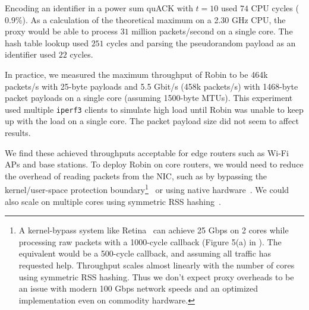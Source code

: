Encoding an identifier in a power sum quACK with $t=10$ used $74$ CPU
cycles ($0.9\%$). As a calculation of the theoretical maximum on a 2.30 GHz
CPU, the proxy would be able to process $31$ million packets/second on a single
core. The hash table lookup used $251$ cycles and parsing the pseudorandom
payload as an identifier used $22$ cycles.

In practice, we measured the maximum throughput of Robin to
be 464k packets/s with 25-byte payloads and 5.5 Gbit/s (458k packets/s) with
1468-byte packet payloads on a single core (assuming 1500-byte MTUs).
This experiment used multiple \texttt{iperf3} clients to simulate high
load until Robin was unable to keep up with the load on a single core.
The packet payload size did not seem to affect results.

We find these achieved throughputs acceptable for edge routers such as Wi-Fi
APs and base stations.
To deploy Robin on core routers, we would need to reduce the overhead of reading
packets from the NIC, such as by bypassing the kernel/user-space
protection boundary\footnote{
A kernel-bypass system like Retina~\cite{wan2022retina} can achieve
25 Gbps on 2 cores while processing raw packets with a 1000-cycle callback
(Figure 5(a) in \cite{wan2022retina}). The \Sys equivalent would be a 500-cycle
callback, and assuming all traffic has requested \sys help. Throughput scales
almost linearly with the number of cores using symmetric RSS hashing.
Thus we don't expect proxy overheads to be an issue with modern 100 Gbps network
speeds and an optimized implementation even on commodity hardware.
}~\cite{dpdk,mccanne1993bsd,wan2022retina}
or using native hardware~\cite{bosshart2014p4}.
We could also scale on multiple cores using symmetric RSS hashing~\cite{woo2012scalable}.


